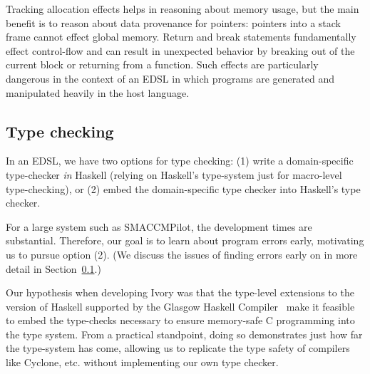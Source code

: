 \noindent
Tracking allocation effects helps in reasoning about memory usage, but the main
benefit is to reason about data provenance for pointers: pointers into a stack
frame cannot effect global memory.  Return and break statements fundamentally
effect control-flow and can result in unexpected behavior by breaking out of the
current block or returning from a function.  Such effects are particularly
dangerous in the context of an EDSL in which programs are generated and
manipulated heavily in the host language.

\subsection{Type checking}
In an EDSL, we have two options for type checking: (1) write a domain-specific
type-checker \emph{in} Haskell (relying on Haskell's type-system just for
macro-level type-checking), or (2) embed the domain-specific type checker into
Haskell's type checker.

For a large system such as SMACCMPilot, the development times are substantial.
Therefore, our goal is to learn about program errors early, motivating us to
pursue option (2).  (We discuss the issues of finding errors early on in more
detail in Section~\ref{}.)

Our hypothesis when developing Ivory was that the type-level extensions to the
version of Haskell supported by the Glasgow Haskell Compiler~\cite{dephaskell}
make it feasible to embed the type-checks necessary to ensure memory-safe C
programming into the type system.  From a practical standpoint, doing so
demonstrates just how far the type-system has come, allowing us to replicate the
type safety of compilers like Cyclone, etc. without implementing our own type
checker.

